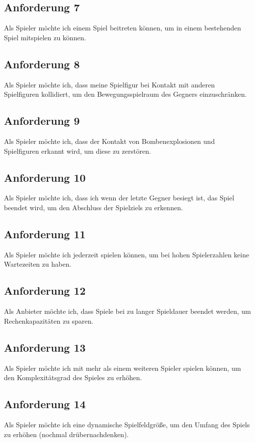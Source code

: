 \documentclass[conference]{IEEEtran}
\begin{document}
\subsection{Anforderung 7} 
Als Spieler möchte ich einem Spiel beitreten können, um in einem bestehenden Spiel mitspielen zu können.

\subsection{Anforderung 8}
Als Spieler möchte ich, dass meine Spielfigur bei Kontakt mit anderen Spielfiguren kollidiert, um den Bewegungsspielraum des Gegners einzuschränken.

\subsection{Anforderung 9}
Als Spieler möchte ich, dass der Kontakt von Bombenexplosionen und Spielfiguren erkannt wird, um diese zu zerstören.

\subsection{Anforderung 10}
Als Spieler möchte ich, dass ich wenn der letzte Gegner besiegt ist, das Spiel beendet wird, um den Abschluss der Spielziels zu erkennen.

\subsection{Anforderung 11}
Als Spieler möchte ich jederzeit spielen können, um bei hohen Spielerzahlen keine Wartezeiten zu haben.

\subsection{Anforderung 12} 
Als Anbieter möchte ich, dass Spiele bei zu langer Spieldauer beendet werden, um Rechenkapazitäten zu sparen.

\subsection{Anforderung 13}
Als Spieler möchte ich mit mehr als einem weiteren Spieler spielen können, um den Komplexitätsgrad des Spieles zu erhöhen.

\subsection{Anforderung 14}
Als Spieler möchte ich eine dynamische Spielfeldgröße, um den Umfang des Spiels zu erhöhen (nochmal drübernachdenken).
\end{document}
